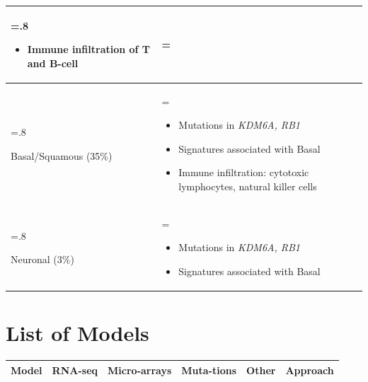 \begin{appendices}
\begin{table}[!htb]
\begin{tabularx}{\textwidth}{>{\hsize=.8\hsize\raggedright\arraybackslash}X >{\hsize=\hsize\arraybackslash}X}
\begin{itemize}[leftmargin=*, nosep, after=\vspace{-\baselineskip}]
        \item Immune infiltration of T and B-cell
    \end{itemize} \\
    \midrule
    Basal/Squamous (35\%) & 
    \begin{itemize}[leftmargin=*, nosep, after=\vspace{-\baselineskip}]
        \item Mutations in \textit{KDM6A, RB1}
        \item Signatures associated with Basal
        \item Immune infiltration: cytotoxic lymphocytes, natural killer cells
    \end{itemize} \\
    \midrule
    Neuronal (3\%) & 
    \begin{itemize}[leftmargin=*, nosep, after=\vspace{-\baselineskip}]
        \item Mutations in \textit{KDM6A, RB1}
        \item Signatures associated with Basal
    \end{itemize} \\
    \bottomrule
    \end{tabularx}
    \label{tab:lit:consensus_genes}
\end{table}

\newpage



\section{List of Models} \label{ap:tables_models}

\newpage

\begin{center}
\begin{small} %
\begin{longtable}{|p{3cm}|c|p{1.2cm}|c|p{2.0cm}|p{4.0cm}|}
    \hline \textbf{Model} 
    & \multicolumn{1}{p{1.0cm}|}{\textbf{RNA-seq}} 
    & \multicolumn{1}{p{1.2cm}|}{\textbf{Micro-arrays}} 
    & \multicolumn{1}{p{1.0cm}|}{\textbf{Muta-tions}} 
    & \textbf{Other}
    & \textbf{Approach}  \\ \hline  \hline
    \endfirsthead
    

\end{longtable}
\end{small}
\end{center}
\end{appendices}
